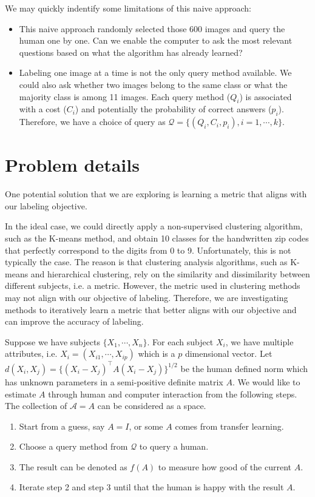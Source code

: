 \documentclass[12pt]{article}
\def\cal{\mathcal}
\def\calA{{\cal A}} %
\def\calQ{{\cal Q}} %
\begin{document}
We may quickly indentify some limitations of this naive approach:

\begin{itemize}
	\item This naive approach randomly selected those 600 images and query the human one by one. Can we enable the computer to ask the most relevant questions based on what the algorithm has already learned? 
	\item Labeling one image at a time is not the only query method available. We could also ask whether two images belong to the same class or what the majority class is among 11 images. Each query method ($Q_i$) is associated with a cost ($C_i$) and potentially the probability of correct answers ($p_i$). Therefore, we have a choice of query as $\calQ = \{(Q_i, C_i, p_i), i=1,\cdots, k\}$. 
\end{itemize}


\section{Problem details}


One potential solution that we are exploring is learning a metric that aligns with our labeling objective.

In the ideal case, we could directly apply a non-supervised clustering algorithm, such as the K-means method, and obtain 10 classes for the handwritten zip codes that perfectly correspond to the digits from 0 to 9. Unfortunately, this is not typically the case. The reason is that clustering analysis algorithms, such as K-means and hierarchical clustering, rely on the similarity and dissimilarity between different subjects, i.e. a metric. However, the metric used in clustering methods may not align with our objective of labeling. Therefore, we are investigating methods to iteratively learn a metric that better aligns with our objective and can improve the accuracy of labeling.


Suppose we have subjects $\{X_1,\cdots, X_n\}$. For each subject $X_i$, we have multiple attributes, i.e. $X_i=(X_{i1},\cdots, X_{ip})$ which is a $p$ dimensional vector.  Let $d(X_i, X_j)=\{ (X_i-X_j)^\top A (X_i-X_j) \}^{1/2}$ be the human defined norm which has unknown parameters in a semi-positive definite matrix $A$. We would like to estimate $A$ through human and computer interaction from the following steps. The collection of $ \calA ={A} $ can be considered as a space. 

\begin{enumerate}
	\item Start from a guess, say $A=I$, or some $A$ comes from transfer learning.
	\item Choose a query method from $\calQ$ to query a human.
	\item The result can be denoted as $f(A)$ to measure how good of the current $A$.
	\item Iterate step 2 and step 3 until that the human is happy with the result $A$.  
\end{enumerate}
\end{document}
